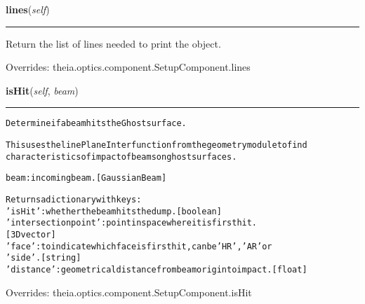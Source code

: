     \vspace{0.5ex}

\hspace{.8\funcindent}\begin{boxedminipage}{\funcwidth}

    \raggedright \textbf{lines}(\textit{self})

    \vspace{-1.5ex}

    \rule{\textwidth}{0.5\fboxrule}
\setlength{\parskip}{2ex}
    Return the list of lines needed to print the object.

\setlength{\parskip}{1ex}
      Overrides: theia.optics.component.SetupComponent.lines

    \end{boxedminipage}

    \vspace{0.5ex}

\hspace{.8\funcindent}\begin{boxedminipage}{\funcwidth}

    \raggedright \textbf{isHit}(\textit{self}, \textit{beam})

    \vspace{-1.5ex}

    \rule{\textwidth}{0.5\fboxrule}
\setlength{\parskip}{2ex}
\begin{alltt}
Determine if a beam hits the Ghost surface.

This uses the linePlaneInter function from the geometry module to find
characteristics of impact of beams on ghost surfaces.

beam: incoming beam. [GaussianBeam]

Returns a dictionary with keys:
    'isHit': whether the beam hits the dump. [boolean]
    'intersection point': point in space where it is first hit.
        [3D vector]
    'face': to indicate which face is first hit, can be 'HR', 'AR' or
        'side'. [string]
    'distance': geometrical distance from beam origin to impact. [float]
\end{alltt}

\setlength{\parskip}{1ex}
      Overrides: theia.optics.component.SetupComponent.isHit

    \end{boxedminipage}

    \vspace{0.5ex}

